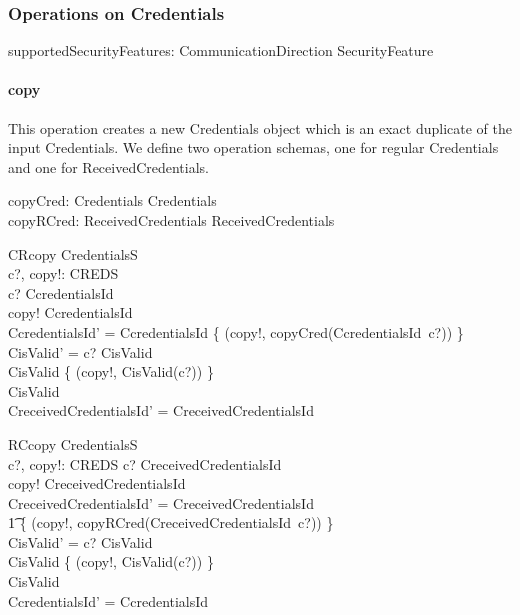 \subsubsection{Operations on Credentials}
\begin{axdef}
  supportedSecurityFeatures: CommunicationDirection \rel SecurityFeature \\
\end{axdef}


\paragraph{copy}
This operation creates a new Credentials object which is an exact duplicate of
the input Credentials.  We define two operation schemas, one for regular
Credentials and one for ReceivedCredentials.
\begin{axdef}
  copyCred: Credentials \fun Credentials \\
  copyRCred: ReceivedCredentials \fun ReceivedCredentials \\
\end{axdef}
\begin{schema}{CRcopy}
  \Delta CredentialsS \\
  c?, copy!: CREDS \\
  \where
  c? \in \dom CcredentialsId \\
  copy! \notin \dom CcredentialsId \\ 
  CcredentialsId' = CcredentialsId \cup \{ (copy!, copyCred(CcredentialsId~c?)) \} \\
  CisValid' = \< \IF c? \in \dom CisValid \\
  \THEN CisValid \cup \{ (copy!, CisValid(c?)) \} \\
  \ELSE CisValid \> \\
  CreceivedCredentialsId' = CreceivedCredentialsId  \\
\end{schema}
\begin{schema}{RCcopy}
  \Delta CredentialsS \\
  c?, copy!: CREDS 
  \where
  c? \in \dom CreceivedCredentialsId \\
  copy! \notin \dom CreceivedCredentialsId \\ 
  CreceivedCredentialsId' = CreceivedCredentialsId \cup \\
  \t1 \{ (copy!, copyRCred(CreceivedCredentialsId~c?)) \} \\ 
  CisValid' = \< \IF c? \in \dom CisValid \\
  \THEN CisValid \cup \{ (copy!, CisValid(c?)) \} \\
  \ELSE CisValid \> \\
  CcredentialsId' = CcredentialsId  \\
\end{schema}
